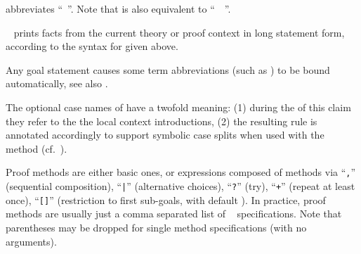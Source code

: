 \begin{isabellebody}
\begin{isamarkuptext}
\begin{description}
  \item \hyperlink{command.thus}{\mbox{}} abbreviates ``\hyperlink{command.then}{\mbox{}}~\hyperlink{command.show}{\mbox{}}''.  Note that \hyperlink{command.thus}{\mbox{}} is also equivalent to
  ``\hyperlink{command.from}{\mbox{}}~~\hyperlink{command.show}{\mbox{}}''.
  
  \item \hyperlink{command.print-statement}{\mbox{}}~ prints facts from the
  current theory or proof context in long statement form, according to
  the syntax for \hyperlink{command.lemma}{\mbox{}} given above.

  \end{description}

  Any goal statement causes some term abbreviations (such as
  \hyperlink{variable.?thesis}{\mbox{}}) to be bound automatically, see also
  .

  The optional case names of \hyperlink{element.obtains}{\mbox{}} have a twofold
  meaning: (1) during the of this claim they refer to the the local
  context introductions, (2) the resulting rule is annotated
  accordingly to support symbolic case splits when used with the
  \hyperlink{method.cases}{\mbox{}} method (cf.\ ).%
\end{isamarkuptext}%
\isamarkuptrue%
%
\isamarkuptrue%
%
\isamarkuptrue%
%
\begin{isamarkuptext}%
Proof methods are either basic ones, or expressions composed
  of methods via ``\verb|,|'' (sequential composition),
  ``\verb||\verb,|,\verb||'' (alternative choices), ``\verb|?|''
  (try), ``\verb|+|'' (repeat at least once), ``\verb|[|\verb|]|'' (restriction to first 
  sub-goals, with default ).  In practice, proof
  methods are usually just a comma separated list of \hyperlink{syntax.nameref}{\mbox{}}~\hyperlink{syntax.args}{\mbox{}} specifications.  Note that parentheses may
  be dropped for single method specifications (with no arguments).


\end{isamarkuptext}
\end{isabellebody}
